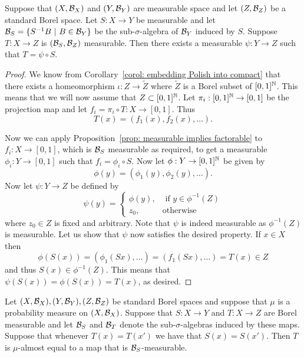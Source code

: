 \documentclass[twoside, a4paper, 10pt]{amsart}
\begin{document}
 \begin{prop} \label{prop: borel measurable implies factorable} Suppose that $(X,\mathcal{B}_X)$ and $(Y,\mathcal{B}_Y)$ are measurable space and let $(Z,\mathcal{B}_Z)$ be a standard Borel space. Let $S:X \to Y$ be measurable and let $\mathcal{B}_S = \{ S^{-1}B ~|~ B \in \mathcal{B}_Y\}$ be the sub-$\sigma$-algebra of $\mathcal{B}_Y$ induced by $S$. 
Suppose $T:X \to Z$ is $(\mathcal{B}_S, \mathcal{B}_Z)$ measurable. Then there exists a measurable $\psi:Y \to Z$ such that $T = \psi \circ S$. 
\end{prop}

\begin{proof} We know  from Corollary~\ref{corol: embedding Polish into compact} that there exists a homeomorphism $\iota:Z \to \widetilde{Z}$ where $\widetilde{Z}$ is a Borel subset of $[0,1]^{\mathbb{N}}$. This means that we will now assume that $Z \subset [0,1]^{\mathbb{N}}$. Let $\pi_i:[0,1]^{\mathbb{N}} \to [0,1]$ be the projection map and let $f_i = \pi_i \circ T: X \to [0,1]$. Thus $$T(x) = (f_1(x), f_2(x), \ldots ).$$

Now we can apply  Proposition~\ref{prop: measurable implies factorable} to $f_i:X \to [0,1]$, which is $\mathcal{B}_S$ measurable as required, to get a measurable $\phi_i:Y \to [0,1]$ such that $f_i = \phi_i \circ S$. Now let $\phi:Y \to [0,1]^{\mathbb{N}}$ be given by $$\phi(y) = (\phi_1(y), \phi_2(y),\ldots ).$$ Now let $\psi:Y\to Z$ be defined by 
$$\psi(y) =  \begin{cases}\phi(y), & \text{ if } y \in \phi^{-1}(Z) \\
z_0, & \text{otherwise} \end{cases}$$ where $z_0 \in Z$ is fixed and arbitrary. Note that $\psi$ is indeed measurable as $\phi^{-1}(Z)$ is measurable. Let us show that $\psi$ now satisfies the desired property. If $x \in X$ then $$\phi(S(x)) = (\phi_1(Sx), \ldots) = (f_1(Sx), \ldots) = T(x) \in Z$$ and thus $S(x) \in \phi^{-1}(Z)$. This means that $\psi(S(x)) = \phi(S(x)) = T(x)$, as desired. \end{proof}

\begin{prop} Let $(X,\mathcal{B}_X), (Y,\mathcal{B}_Y), (Z,\mathcal{B}_Z)$ be standard Borel spaces and suppose that $\mu$ is a probability measure on $(X, \mathcal{B}_X)$. Suppose that $S:X \to Y$ and $T:X \to Z$ are Borel measurable and let $\mathcal{B}_S$ and $\mathcal{B}_T$ denote the sub-$\sigma$-algebras induced by these maps. Suppose that whenever $T(x) = T(x')$ we have that $S(x) = S(x')$. Then $T$ is $\mu$-almost equal to a map that is $\mathcal{B}_S$-measurable. \end{prop}
\end{document}

